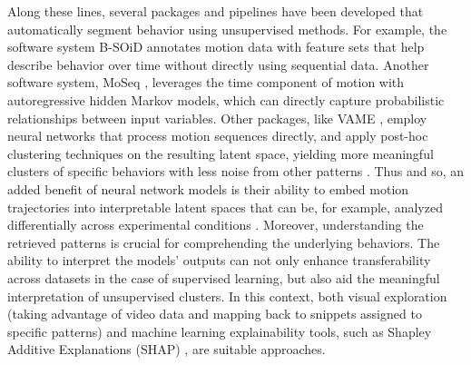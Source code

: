 Along these lines, several packages and pipelines have been developed that automatically segment behavior using unsupervised methods. For example, the software system B-SOiD \cite{Hsu2021B-SOiDBehaviors} annotates motion data with feature sets that help describe behavior over time without directly using sequential data. Another software system, MoSeq \cite{Weinreb2023Keypoint-MoSeq:Dynamics, Wiltschko2020RevealingSequencing}, leverages the time component of motion with autoregressive hidden Markov models, which can directly capture probabilistic relationships between input variables. Other packages, like VAME \cite{Luxem2022IdentifyingMotion}, employ neural networks that process motion sequences directly, and apply post-hoc clustering techniques on the resulting latent space, yielding more meaningful clusters of specific behaviors with less noise from other patterns \cite{Rubio2023Auto-EncodersPerspectives}. Thus and so, an added benefit of neural network models is their ability to embed motion trajectories into interpretable latent spaces that can be, for example, analyzed differentially across experimental conditions \cite{Bordes2023AutomaticallyStress}. Moreover, understanding the retrieved patterns is crucial for comprehending the underlying behaviors. The ability to interpret the models' outputs can not only enhance transferability across datasets in the case of supervised learning, but also aid the meaningful interpretation of unsupervised clusters. In this context, both visual exploration (taking advantage of video data and mapping back to snippets assigned to specific patterns) and machine learning explainability tools, such as Shapley Additive Explanations (SHAP) \cite{Goodwin2022TowardNeuroscience}, are suitable approaches.

